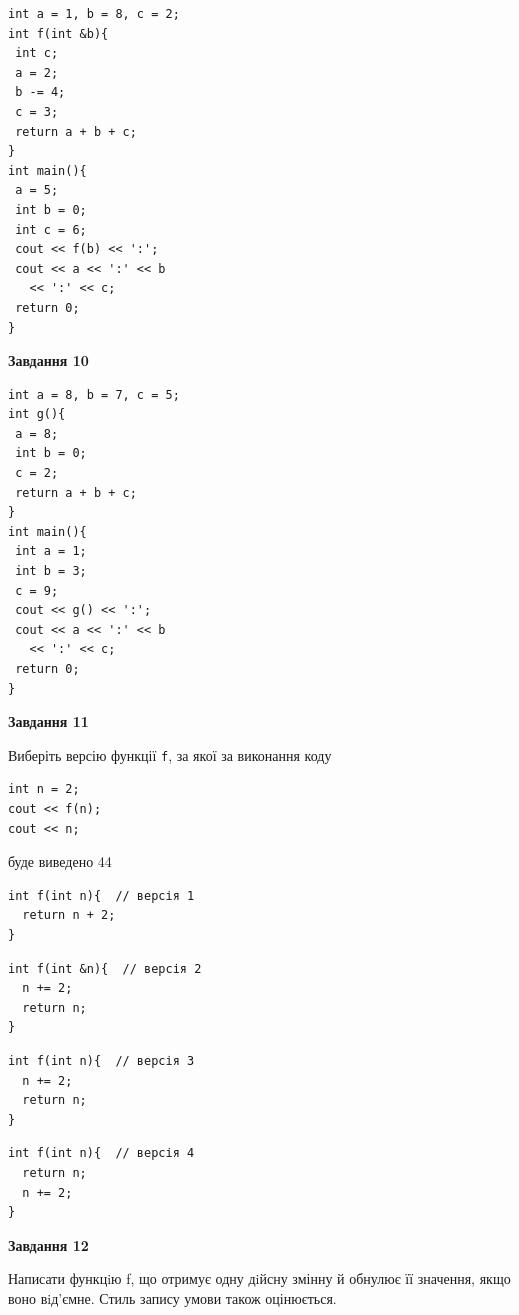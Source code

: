\documentclass[12pt, ukrainian]{article}
\def\code#1{\Verb!#1!}
\begin{document}
{\begin {large}
\begin{minipage}[t]{7.0cm}
\begin{verbatim}
int a = 1, b = 8, c = 2;
int f(int &b){
 int c;
 a = 2;
 b -= 4;
 c = 3;
 return a + b + c;
}
int main(){
 a = 5;
 int b = 0;
 int c = 6;
 cout << f(b) << ':';
 cout << a << ':' << b 
   << ':' << c;
 return 0;
}
\end{verbatim}



\begin{center}
\textbf{Завдання 10}
\end{center}
\vspace{-8mm}

\begin{verbatim}
int a = 8, b = 7, c = 5;
int g(){
 a = 8;
 int b = 0;
 c = 2;
 return a + b + c;
}
int main(){
 int a = 1;
 int b = 3;
 c = 9;
 cout << g() << ':';
 cout << a << ':' << b 
   << ':' << c;
 return 0;
}
\end{verbatim}

\end{minipage}
\vline \hspace{1mm}
\begin{minipage}[t]{11.0cm}

\begin{center}
\textbf{Завдання 11}
\end{center}
Виберіть версію функції \code{f}, за якої за виконання коду
\begin{verbatim}
int n = 2;
cout << f(n);
cout << n;
\end{verbatim}

буде виведено 44

\begin{verbatim}
int f(int n){  // версія 1
  return n + 2;
}
\end{verbatim}

\vspace{-8mm}\begin{verbatim}
int f(int &n){  // версія 2
  n += 2;
  return n;
}
\end{verbatim}

\vspace{-8mm}\begin{verbatim}
int f(int n){  // версія 3
  n += 2;
  return n;
}
\end{verbatim}

\vspace{-8mm}\begin{verbatim}
int f(int n){  // версія 4
  return n;
  n += 2;
}
\end{verbatim}



\begin{center}
\textbf{Завдання 12}
\end{center}

Написати функцiю f, що отримує одну дiйсну змінну й обнулює її значення, якщо воно вiд'ємне. Стиль запису умови також оцінюється.\par

\end{minipage}

\end {large}}
\newpage
\end{document}
